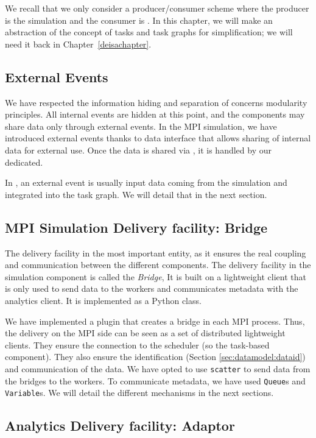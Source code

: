 We recall that we only consider a producer/consumer scheme where the producer is the simulation and the consumer is \dask. In this chapter, we will make an abstraction of the concept of \deisa tasks and \deisa task graphs for simplification; we will need it back in Chapter~\ref{deisachapter}. 

\subsection{External Events}

We have respected the information hiding and separation of concerns modularity principles. All internal events are hidden at this point, and the components may share data only through external events. 
In the MPI simulation, we have introduced external events thanks to \pdi data interface that allows sharing of internal data for external use. Once the data is shared via \pdi, it is handled by our dedicated.

In \dask,  an external event is usually input data coming from the simulation and integrated into the task graph. We will detail that in the next section.   



\subsection{MPI Simulation Delivery facility: Bridge}\label{sec:bridge}
The delivery facility in the most important entity, as it ensures the real coupling and communication between the different components.
The delivery facility in the simulation component is called the \textit{Bridge}, 
It is built on a lightweight \dask client that is only used to send data to the workers and communicates metadata with the analytics client. It is implemented as a Python class.

We have implemented a \pdi plugin that creates a bridge in each MPI process. Thus,  the delivery on the MPI side can be seen as a set of distributed lightweight \dask clients. They ensure the connection to the \dask scheduler (so the task-based component). They also ensure the identification (Section \ref{sec:datamodel:dataid}) and communication of the data. 
We have opted to use \texttt{scatter} to send data from the  bridges to the \dask workers. To communicate metadata, we have used \dask \texttt{Queue}s and \texttt{Variable}s. We will detail the different mechanisms in the next sections.  


\subsection{\dask Analytics Delivery facility: Adaptor}\label{sec:adaptor}

